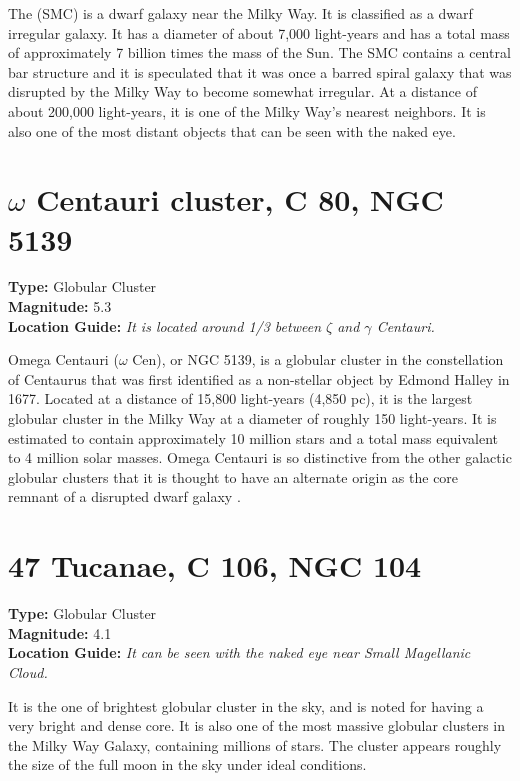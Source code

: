 The  (SMC) is a dwarf galaxy near
the Milky Way. It is classified as a dwarf irregular galaxy. It has a
diameter of about 7,000 light-years and has a total mass of
approximately 7 billion times the mass of the Sun. The SMC contains a
central bar structure and it is speculated that it was once a barred
spiral galaxy that was disrupted by the Milky Way to become somewhat
irregular. At a distance of about 200,000 light-years, it is one of
the Milky Way's nearest neighbors. It is also one of the most distant
objects that can be seen with the naked eye.

\section{\texorpdfstring{$\omega$}{omega} Centauri cluster, C 80, NGC 5139}
\textbf{Type:} Globular Cluster \\
\textbf{Magnitude:} 5.3 \\ 
\textbf{Location Guide:} \textit{It is located around 1/3 between $\zeta$ and $\gamma$ Centauri.}

Omega Centauri ($\omega$ Cen), or NGC 5139, is a globular cluster in
the constellation of Centaurus that was first identified as a
non-stellar object by Edmond Halley in 1677. Located at a distance of
15,800 light-years (4,850 pc), it is the largest globular cluster in
the Milky Way at a diameter of roughly 150 light-years. It is
estimated to contain approximately 10 million stars and a total mass
equivalent to 4 million solar masses. Omega Centauri is so distinctive
from the other galactic globular clusters that it is thought to have
an alternate origin as the core remnant of a disrupted dwarf galaxy
\citep{2008ApJ...676.1008N}.

\section{47 Tucanae, C 106, NGC 104}
\textbf{Type:} Globular Cluster \\
\textbf{Magnitude:} 4.1 \\ 
\textbf{Location Guide:} \textit{It can be seen with the naked eye near Small Magellanic Cloud.}

It is the one of brightest globular cluster in the sky, and is noted
for having a very bright and dense core. It is also one of the most
massive globular clusters in the Milky Way Galaxy, containing millions of
stars. The cluster appears roughly the size of the full moon in the
sky under ideal conditions.

